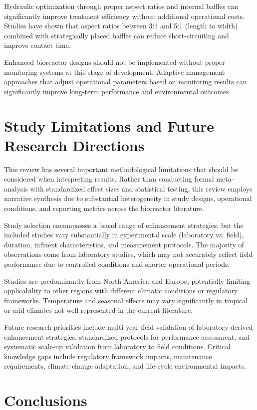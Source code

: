 \documentclass[12pt,a4paper]{article}
\begin{document}
Hydraulic optimization through proper aspect ratios and internal baffles can significantly improve treatment efficiency without additional operational costs. Studies have shown that aspect ratios between 3:1 and 5:1 (length to width) combined with strategically placed baffles can reduce short-circuiting and improve contact time.

Enhanced bioreactor designs should not be implemented without proper monitoring systems at this stage of development. Adaptive management approaches that adjust operational parameters based on monitoring results can significantly improve long-term performance and environmental outcomes.

\section{Study Limitations and Future Research Directions}

This review has several important methodological limitations that should be considered when interpreting results. Rather than conducting formal meta-analysis with standardized effect sizes and statistical testing, this review employs narrative synthesis due to substantial heterogeneity in study designs, operational conditions, and reporting metrics across the bioreactor literature.

Study selection encompasses a broad range of enhancement strategies, but the included studies vary substantially in experimental scale (laboratory vs. field), duration, influent characteristics, and measurement protocols. The majority of observations come from laboratory studies, which may not accurately reflect field performance due to controlled conditions and shorter operational periods.

Studies are predominantly from North America and Europe, potentially limiting applicability to other regions with different climatic conditions or regulatory frameworks. Temperature and seasonal effects may vary significantly in tropical or arid climates not well-represented in the current literature.

Future research priorities include multi-year field validation of laboratory-derived enhancement strategies, standardized protocols for performance assessment, and systematic scale-up validation from laboratory to field conditions. Critical knowledge gaps include regulatory framework impacts, maintenance requirements, climate change adaptation, and life-cycle environmental impacts.

\section{Conclusions}
\end{document}
